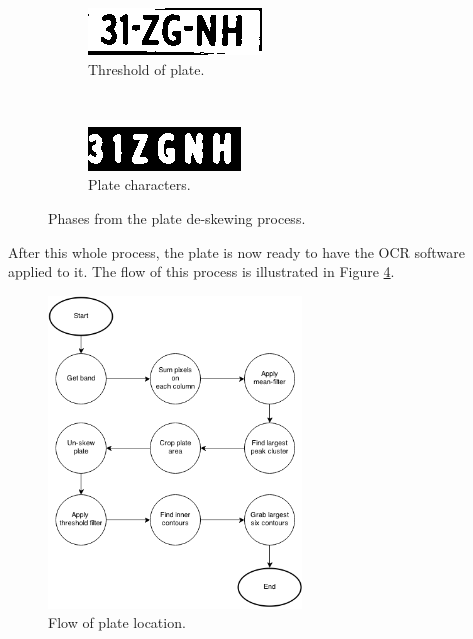 \begin{figure}[ht]
        \begin{subfigure}{0.33\textwidth}
            \includegraphics[width=\textwidth]{plaatjes/remove-border-plate}
            \caption{Threshold of plate.}
            \label{fig:threshold-plate}
        \end{subfigure}%
        ~
        \begin{subfigure}{0.33\textwidth}
            \includegraphics[width=\textwidth]{plaatjes/6-characters}
            \caption{Plate characters.}
            \label{fig:6-characters}
        \end{subfigure}%
        \caption{Phases from the plate de-skewing process.}
        \label{fig:deskewing-plate}
\end{figure}

After this whole process, the plate is now ready to have the OCR software applied to it. The flow of this process is illustrated in Figure \ref{fig:find-plate-flow}.

\begin{figure}[ht]
    \centering
    \includegraphics[width=0.6\textwidth]{plaatjes/find-plate-flow}
    \caption{Flow of plate location.}
    \label{fig:find-plate-flow}
\end{figure}%

